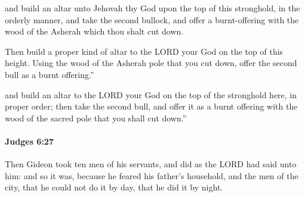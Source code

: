 			\begin{versebox}
					\item[BHS] 
					\item[ASV] and build an altar unto Jehovah thy God upon the top of this stronghold, in the orderly manner, and take the second bullock, and offer a burnt-offering with the wood of the Asherah which thou shalt cut down.
					\item[NIV] Then build a proper kind of altar to the LORD your God on the top of this height. Using the wood of the Asherah pole that you cut down, offer the second bull as a burnt offering.”
					\item[NRSV] and build an altar to the LORD your God on the top of the stronghold here, in proper order; then take the second bull, and offer it as a burnt offering with the wood of the sacred pole that you shall cut down.”
			\end{versebox}

		\paragraph{Judges 6:27} %
			\label{JUDGES-6-27}

			Then Gideon took ten men of his servants, and did as the LORD had said unto him: and so it was, because he feared his father’s household, and the men of the city, that he could not do it by day, that he did it by night.

